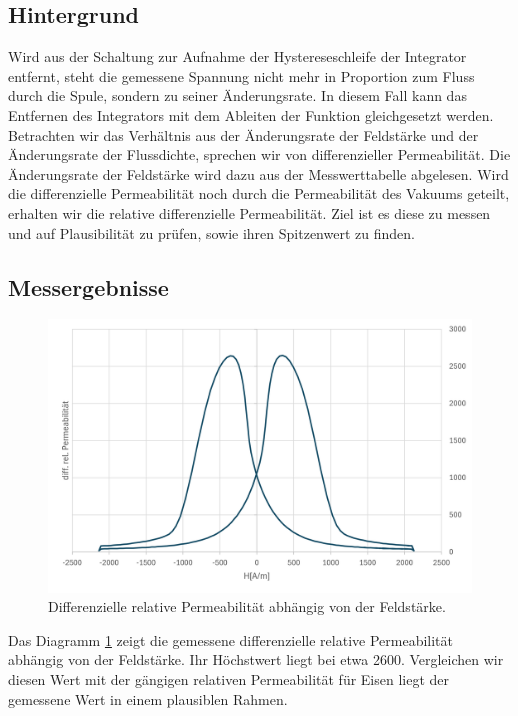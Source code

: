\documentclass[a4paper,twoside,12pt,DIV=13,BCOR=5mm,numbers=noenddot,cleardoublepage=empty]{scrbook}
\begin{document}
        \subsection{Hintergrund}
        Wird aus der Schaltung zur Aufnahme der Hystereseschleife der Integrator entfernt, steht die gemessene Spannung nicht mehr in Proportion 
        zum Fluss durch die Spule, sondern zu seiner \"Anderungsrate. In diesem Fall kann das Entfernen des Integrators mit dem Ableiten der Funktion
        gleichgesetzt werden. Betrachten wir das Verh\"altnis aus der \"Anderungsrate der Feldst\"arke und der \"Anderungsrate der Flussdichte, sprechen wir von 
        differenzieller Permeabilit\"at. Die \"Anderungsrate der Feldstärke wird dazu aus der Messwerttabelle abgelesen. Wird die differenzielle Permeabilit\"at noch durch die Permeabilit\"at des Vakuums geteilt, erhalten wir die relative differenzielle Permeabilit\"at. Ziel ist es diese zu messen 
        und auf Plausibilit\"at zu pr\"ufen, sowie ihren Spitzenwert zu finden.
        \subsection{Messergebnisse}
        \begin{figure}
          \centering
          \includegraphics[width=0.9\linewidth]{pictures/Permeabilitaet.png}
          \caption{Differenzielle relative Permeabilit\"at abh\"angig von der Feldst\"arke.}
          \label{fig:perm}
        \end{figure}
        Das Diagramm \ref{fig:perm} zeigt die gemessene differenzielle relative Permeabilit\"at abh\"angig von der Feldst\"arke. Ihr H\"ochstwert liegt bei etwa 2600. 
        Vergleichen wir diesen Wert mit der g\"angigen relativen Permeabilit\"at f\"ur Eisen liegt der gemessene Wert in einem plausiblen Rahmen.
        
\end{document}
